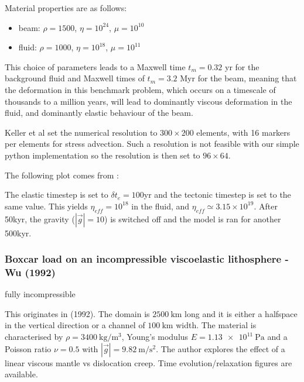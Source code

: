 Material properties are as follows:
\begin{itemize}
\item beam: $\rho=1500$, $\eta=10^{24}$, $\mu=10^{10}$
\item fluid: $\rho=1000$, $\eta=10^{18}$, $\mu=10^{11}$
\end{itemize}

This choice of parameters leads to a Maxwell time 
$t_m = 0.32$ yr for the background fluid and Maxwell times of  
$t_m = 3.2$ Myr for the beam, meaning that the deformation in this benchmark problem, 
which occurs on a timescale of thousands to a million years, 
will lead to dominantly viscous deformation in the fluid, 
and dominantly elastic behaviour of the beam. 

Keller et al set the numerical resolution to $300\times200$ elements, 
with 16 markers per elements for stress advection. Such a resolution is  
not feasible with our simple python implementation so the resolution is
then set to $96\times64$. 

The following plot comes from \cite{kemk13}:
\begin{center}
\end{center}

The elastic timestep is set to $\delta t_e=100$yr and the tectonic timestep is set to the same value.
This yields $\eta_{eff}=10^{18}$ in the fluid, and $\eta_{eff}\simeq 3.15\times 10^{19}$.
After 50kyr, the gravity ($|\vec{g}|=10$) is switched off and the model is ran for another 
500kyr.


\subsubsection{Boxcar load on an incompressible viscoelastic lithosphere - Wu (1992)}

{\color{orange} fully incompressible}

This originates in \textcite{wu92} (1992).
The domain is $2500~\si{\km}$ long and it is either 
a halfspace in the vertical direction 
or a channel of $100~\si{\km}$ width. 
The material is characterised by 
$\rho=3400~\si{\kg\per\cubic\meter}$, 
Young's modulus $E=\SI{1.13e11}{\pascal}$ 
and a Poisson ratio $\nu=0.5$ with $|\vec{g}|=9.82~\si{\meter\per\square\second}$.
The author explores the effect of a linear viscous mantle vs dislocation creep.
Time evolution/relaxation figures are available.


